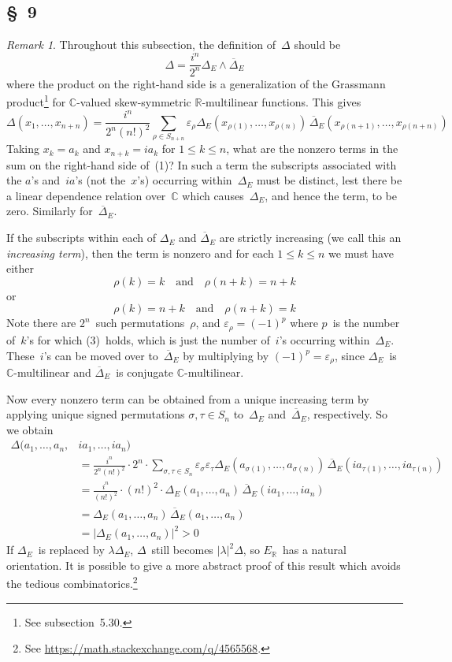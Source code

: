 \documentclass[letterpaper,12pt]{article}
\newcommand{\R}{\mathbb{R}}
\newcommand{\C}{\mathbb{C}}
\newcommand{\mult}{\cdot}
\newcommand{\eprod}{\wedge}
\newcommand{\abs}[1]{|#1|}
\newcommand{\conj}[1]{\overline{#1}}
\newcommand{\sign}[1]{\varepsilon_{#1}}
\newcommand{\ur}[1]{#1_{\R}}
\theoremstyle{definition}
\theoremstyle{remark}
\newtheorem*{rmk}{Remark}
\begin{document}
\subsection*{\S~9}
\begin{rmk}
Throughout this subsection, the definition of~\(\Delta\) should be
\[\Delta=\frac{i^n}{2^n}\Delta_E\eprod\conj{\Delta}_E\]
where the product on the right-hand side is a generalization of the Grassmann product\footnote{See subsection~5.30.} for \(\C\)-valued skew-symmetric \(\R\)-multilinear functions. This gives
\[\Delta(x_1,\ldots,x_{n+n})=\frac{i^n}{2^n(n!)^2}\sum_{\rho\in S_{n+n}}\sign{\rho}\Delta_E(x_{\rho(1)},\ldots,x_{\rho(n)})\,\conj{\Delta}_E(x_{\rho(n+1)},\ldots,x_{\rho(n+n)})\tag{1}\]
Taking \(x_k=a_k\) and \(x_{n+k}=ia_k\) for \(1\le k\le n\), what are the nonzero terms in the sum on the right-hand side of~(1)? In such a term the subscripts associated with the \(a\)'s and~\(ia\)'s (not the~\(x\)'s) occurring within~\(\Delta_E\) must be distinct, lest there be a linear dependence relation over~\(\C\) which causes~\(\Delta_E\), and hence the term, to be zero. Similarly for~\(\conj{\Delta}_E\).

If the subscripts within each of \(\Delta_E\) and \(\conj{\Delta}_E\) are strictly increasing (we call this an \emph{increasing term}), then the term is nonzero and for each \(1\le k\le n\) we must have either
\[\rho(k)=k\quad\text{and}\quad\rho(n+k)=n+k\tag{2}\]
or
\[\rho(k)=n+k\quad\text{and}\quad\rho(n+k)=k\tag{3}\]
Note there are \(2^n\)~such permutations~\(\rho\), and \(\sign{\rho}=(-1)^p\) where \(p\)~is the number of~\(k\)'s for which (3)~holds, which is just the number of~\(i\)'s occurring within~\(\Delta_E\). These~\(i\)'s can be moved over to~\(\conj{\Delta}_E\) by multiplying by \((-1)^p=\sign{\rho}\), since \(\Delta_E\)~is \(\C\)-multilinear and \(\conj{\Delta}_E\)~is conjugate \(\C\)-multilinear.

Now every nonzero term can be obtained from a unique increasing term by applying unique signed permutations \(\sigma,\tau\in S_n\) to~\(\Delta_E\) and~\(\conj{\Delta}_E\), respectively. So we obtain
\begin{align*}
\Delta(a_1,\ldots,a_n,&ia_1,\ldots,ia_n)\\
&=\frac{i^n}{2^n(n!)^2}\mult2^n\mult\sum_{\sigma,\tau\in S_n}\sign{\sigma}\sign{\tau}\Delta_E(a_{\sigma(1)},\ldots,a_{\sigma(n)})\,\conj{\Delta}_E(ia_{\tau(1)},\ldots,ia_{\tau(n)})\\
&=\frac{i^n}{(n!)^2}\mult(n!)^2\mult\Delta_E(a_1,\ldots,a_n)\,\conj{\Delta}_E(ia_1,\ldots,ia_n)\\
&=\Delta_E(a_1,\ldots,a_n)\,\conj{\Delta}_E(a_1,\ldots,a_n)\\
&=\abs{\Delta_E(a_1,\ldots,a_n)}^2>0
\end{align*}
If \(\Delta_E\)~is replaced by \(\lambda\Delta_E\), \(\Delta\)~still becomes \(\abs{\lambda}^2\Delta\), so \(\ur{E}\)~has a natural orientation. It is possible to give a more abstract proof of this result which avoids the tedious combinatorics.\footnote{See \url{https://math.stackexchange.com/q/4565568}.}
\end{rmk}
\end{document}
